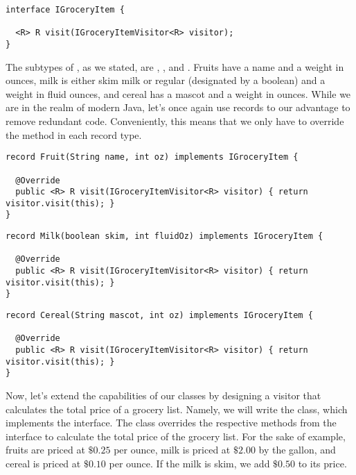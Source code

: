 \begin{cl}[]{}
\begin{lstlisting}[language=MyJava]
interface IGroceryItem {

  <R> R visit(IGroceryItemVisitor<R> visitor);
}
\end{lstlisting}
\end{cl}

The subtypes of , as we stated, are , , and . Fruits have a name and a weight in ounces, milk is either skim milk or regular (designated by a boolean) and a weight in fluid ounces, and cereal has a mascot and a weight in ounces. While we are in the realm of modern Java, let's once again use records to our advantage to remove redundant code. Conveniently, this means that we only have to override the  method in each record type.

\begin{cl}[]{}
\begin{lstlisting}[language=MyJava]
record Fruit(String name, int oz) implements IGroceryItem {

  @Override
  public <R> R visit(IGroceryItemVisitor<R> visitor) { return visitor.visit(this); }
}
\end{lstlisting}
\end{cl}

\begin{cl}[]{}
\begin{lstlisting}[language=MyJava]
record Milk(boolean skim, int fluidOz) implements IGroceryItem {
  
  @Override
  public <R> R visit(IGroceryItemVisitor<R> visitor) { return visitor.visit(this); }
}
\end{lstlisting}
\end{cl}

\begin{cl}[]{}
\begin{lstlisting}[language=MyJava]
record Cereal(String mascot, int oz) implements IGroceryItem {
    
  @Override
  public <R> R visit(IGroceryItemVisitor<R> visitor) { return visitor.visit(this); }
}
\end{lstlisting}
\end{cl}

Now, let's extend the capabilities of our classes by designing a visitor that calculates the total price of a grocery list. Namely, we will write the  class, which implements the  interface. The  class overrides the respective methods from the  interface to calculate the total price of the grocery list. For the sake of example, fruits are priced at $\$0.25$ per ounce, milk is priced at $\$2.00$ by the gallon, and cereal is priced at $\$0.10$ per ounce. If the milk is skim, we add $\$0.50$ to its price.

